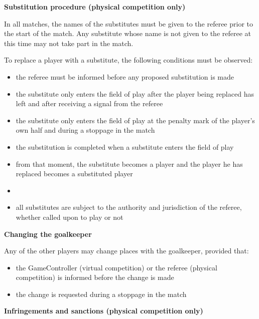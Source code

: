 {\bfseries Substitution procedure (physical competition only)}

\headlinebox

In all matches, the names of the substitutes must be given to the referee prior to the start of the match. Any substitute whose name is not given to the referee at this time may not take part in the match.

\bigskip

To replace a player with a substitute, the following conditions must be observed:

\begin{itemize}
\item the referee must be informed before any proposed substitution is made
\item the substitute only enters the field of play after the player being replaced has left and after receiving a signal from the referee
\item the substitute only enters the field of play at the penalty mark of the player's own half  and during a stoppage in the match
\item the substitution is completed when a substitute enters the field of play
\item from that moment, the substitute becomes a player and the player he has replaced becomes a substituted player
\item {}
\item all substitutes are subject to the authority and jurisdiction of the referee, whether called upon to play or not
\end{itemize}

{\bfseries Changing the goalkeeper}

\headlinebox

Any of the other players may change places with the goalkeeper, provided that:

\begin{itemize}
      \item the GameController (virtual competition) or the referee (physical competition) is informed before the change is made
      \item the change is requested during a stoppage in the match
\end{itemize}

{\bfseries Infringements and sanctions (physical competition only)}

\headlinebox

